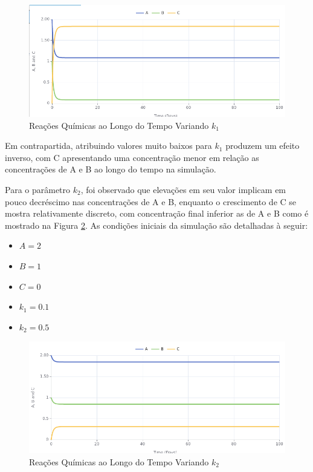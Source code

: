 \documentclass[a4paper, 12pt]{article}
\begin{document}
\begin{figure}[H]
    \centering
    \includegraphics[width=1\textwidth]{Images/Exercise 1/k1.png}
    \caption{Reações Químicas ao Longo do Tempo Variando \(k_1\)}
    \label{fig:exampleFig3}
\end{figure}

Em contrapartida, atribuindo valores muito baixos para \(k_1\) produzem um efeito inverso, com C apresentando uma concentração menor em relação as concentrações de A e B ao longo do tempo na simulação.

Para o parâmetro \(k_2\), foi observado que elevações em seu valor implicam em pouco decréscimo nas concentrações de A e B, enquanto o crescimento de C se mostra relativamente discreto, com concentração final inferior as de A e B como é mostrado na Figura \ref{fig:exampleFig4}. As condições iniciais da simulação são detalhadas à seguir:

\pagebreak

\begin{itemize}
    \item \(A = 2\)
    \item \(B = 1\)
    \item \(C = 0\)
    \item \(k_1 = 0.1\)
    \item \(k_2 = 0.5\)
\end{itemize}

\begin{figure}[H]
    \centering
    \includegraphics[width=1\textwidth]{Images/Exercise 1/k2.png}
    \caption{Reações Químicas ao Longo do Tempo Variando \(k_2\)}
    \label{fig:exampleFig4}
\end{figure}
\end{document}
